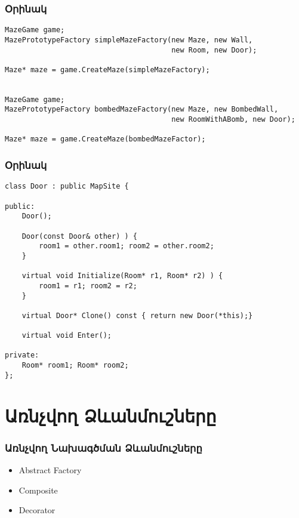 \documentclass{beamer}
\begin{document}
\begin{frame}[fragile]\frametitle{Օրինակ}
\begin{english}
\begin{verbatim}
MazeGame game;
MazePrototypeFactory simpleMazeFactory(new Maze, new Wall,
                                       new Room, new Door);

Maze* maze = game.CreateMaze(simpleMazeFactory);


MazeGame game;
MazePrototypeFactory bombedMazeFactory(new Maze, new BombedWall,
                                       new RoomWithABomb, new Door);

Maze* maze = game.CreateMaze(bombedMazeFactor);
\end{verbatim}
\end{english}
\end{frame}

\begin{frame}[fragile]\frametitle{Օրինակ}
\begin{english}
\begin{verbatim}
class Door : public MapSite {

public:
    Door();

    Door(const Door& other) ) {
        room1 = other.room1; room2 = other.room2;
    }

    virtual void Initialize(Room* r1, Room* r2) ) {
        room1 = r1; room2 = r2;
    }

    virtual Door* Clone() const { return new Door(*this);}

    virtual void Enter();

private:
    Room* room1; Room* room2;
};
\end{verbatim}
\end{english}
\end{frame}

\section{Առնչվող Ձևանմուշները}
\begin{frame}\frametitle{Առնչվող Նախագծման Ձևանմուշները}
\begin{itemize}
    \item Abstract Factory \vfill
    \item Composite \vfill
    \item Decorator
\end{itemize}
\end{frame}
\end{document}
